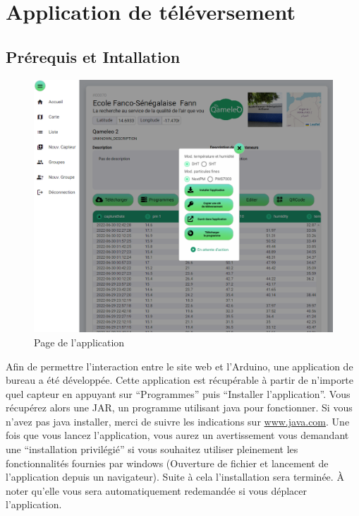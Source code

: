 \section{Application de téléversement}\label{sec:application-de-téléversement}

    \subsection{Prérequis et Intallation}\label{subsec:prerequis-et-intallation}

        \begin{figure}[H]
            \begin{center}
                \includegraphics[width=12cm]{resources/sensor_app}
            \end{center}
            \caption{Page de l'application}\label{fig:page-de-l-application}
        \end{figure}

        Afin de permettre l'interaction entre le site web et l'Arduino, une application de bureau a été développée.
        Cette application est récupérable à partir de n'importe quel capteur en appuyant sur ``Programmes'' puis ``Installer l'application''.
        Vous récupérez alors une JAR, un programme utilisant java pour fonctionner.
        Si vous n'avez pas java installer, merci de suivre les indications sur \href{https://www.java.com}{www.java.com}.
        Une fois que vous lancez l'application, vous aurez un avertissement vous demandant une ``installation privilégié''
        si vous souhaitez utiliser pleinement les fonctionnalités fournies par windows (Ouverture de fichier et lancement de l'application depuis un navigateur).
        Suite à cela l'installation sera terminée.
        À noter qu'elle vous sera automatiquement redemandée si vous déplacer l'application.

